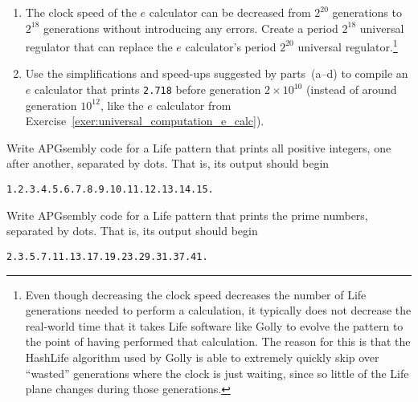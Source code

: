 \begin{multicols}{2}
\begin{problem}
\begin{enumerate}[label=\bf\color{ocre}(\alph*)]
			\item The  clock speed of the $e$ calculator can be decreased from $2^{20}$ generations to $2^{18}$ generations without introducing any errors. Create a period $2^{18}$ universal regulator that can replace the $e$ calculator's period $2^{20}$ universal regulator.\footnote{Even though decreasing the clock speed decreases the number of Life generations needed to perform a calculation, it typically does not decrease the real-world time that it takes Life software like Golly to evolve the pattern to the point of having performed that calculation. The reason for this is that the HashLife algorithm used by Golly is able to extremely quickly skip over ``wasted'' generations where the clock is just waiting, since so little of the Life plane changes during those generations.}
			
			\item Use the simplifications and speed-ups suggested by parts~(a--d) to compile an $e$ calculator that prints \texttt{2.718} before generation $2\times 10^{10}$ (instead of around generation $10^{12}$, like the $e$ calculator from Exercise~\ref{exer:universal_computation_e_calc}).
		\end{enumerate}
	\end{problem}
	
	
	\mfilbreak
	
	
	\begin{problem}\label{exer:universal_computation_print_integers} 
		Write APGsembly code for a Life pattern that prints all positive integers, one after another, separated by dots. That is, its output should begin
		\begin{center}
			\texttt{1.2.3.4.5.6.7.8.9.10.11.12.13.14.15.}
		\end{center}
		
	\end{problem}
	
	
	\mfilbreak
	
	
	\begin{problem}\label{exer:universal_computation_print_prime} 
		Write APGsembly code for a Life pattern that prints the prime numbers, separated by dots. That is, its output should begin
		\begin{center}
			\texttt{2.3.5.7.11.13.17.19.23.29.31.37.41.}
		\end{center}
		

\end{problem}
\end{multicols}
